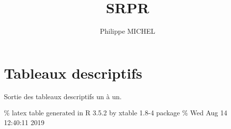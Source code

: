 \documentclass[]{article}
\title{SRPR}
\author{Philippe MICHEL}
\date{}
\begin{document}
\maketitle

{
\setcounter{tocdepth}{2}
\tableofcontents
}


\hypertarget{tableaux-descriptifs}{%
\section{Tableaux descriptifs}\label{tableaux-descriptifs}}

Sortie des tableaux descriptifs un à un.

\% latex table generated in R 3.5.2 by xtable 1.8-4 package \% Wed Aug
14 12:40:11 2019

\begin{longtable}{lll}
  \toprule
  

\end{longtable}
\end{document}

